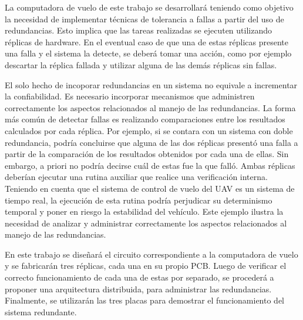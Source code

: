 La computadora de vuelo de este trabajo se desarrollará teniendo como objetivo la necesidad de implementar técnicas de tolerancia a fallas a partir del uso de redundancias. %
Esto implica que las tareas realizadas se ejecuten utilizando réplicas de hardware. En el eventual caso de que una de estas réplicas presente una falla y el sistema la detecte, se deberá tomar una acción, como por ejemplo descartar la réplica fallada y utilizar alguna de las demás réplicas sin fallas. 

El solo hecho de incoporar redundancias en un sistema no equivale a incrementar la confiabilidad. Es necesario incorporar mecanismos que administren correctamente los aspectos relacionados al manejo de las redundancias. La forma más común de detectar fallas es realizando comparaciones entre los resultados calculados por cada réplica. Por ejemplo, si se contara con un sistema con doble redundancia, podría concluirse que alguna de las dos réplicas presentó una falla a partir de la comparación de los resultados obtenidos por cada una de ellas. Sin embargo, a priori no podría decirse cuál de estas fue la que falló. Ambas réplicas deberían ejecutar una rutina auxiliar que realice una verificación interna. Teniendo en cuenta que el sistema de control de vuelo del UAV es un sistema de tiempo real, la ejecución de esta rutina podría perjudicar su determinismo temporal y poner en riesgo la estabilidad del vehículo. Este ejemplo ilustra la necesidad de analizar y administrar correctamente los aspectos relacionados al manejo de las redundancias.

En este trabajo se diseñará el circuito correspondiente a la computadora de vuelo y se fabricarán tres réplicas, cada una en su propio PCB. Luego de verificar el correcto funcionamiento de cada una de estas por separado, se procederá a proponer una arquitectura distribuida, para administrar las redundancias. Finalmente, se utilizarán las tres placas para demostrar el funcionamiento del sistema redundante.



